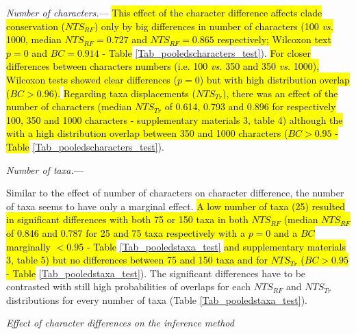 \documentclass[12pt,letterpaper]{article}
\renewcommand{\subsection}[1]{%
\bigskip
\begin{center}
\begin{large}
\normalfont\itshape #1
\end{large}
\end{center}}
\renewcommand{\subsubsection}[1]{%
\vspace{2ex}
\noindent
\textit{#1.}---}
\begin{document}


\subsubsection{Number of characters}
\hl{This effect of the character difference affects clade conservation ($NTS_{RF}$) only by big differences in number of characters (100 \textit{vs.} 1000, median $NTS_{RF} = 0.727$ and $NTS_{RF} = 0.865$ respectively; Wilcoxon text $p = 0$ and $BC = 0.914$ - Table}
\ref{Tab_pooledscharacters_test}).
\hl{For closer differences between characters numbers (i.e. 100 \textit{vs.} 350 and 350 \textit{vs.} 1000), Wilcoxon tests showed clear differences ($p = 0$) but with high distribution overlap ($BC > 0.96$).}
\hl{Regarding taxa displacements ($NTS_{Tr}$), there was an effect of the number of characters (median $NTS_{Tr}$ of 0.614, 0.793 and 0.896 for respectively 100, 350 and 1000 characters - supplementary materials 3, table 4) although the with a high distribution overlap between 350 and 1000 characters ($BC > 0.95$ - Table}
\ref{Tab_pooledscharacters_test}).




\subsubsection{Number of taxa}

Similar to the effect of number of characters on character difference, the number of taxa seems to have only a marginal effect.
\hl{A low number of taxa (25) resulted in significant differences with both 75 or 150 taxa in both $NTS_{RF}$ (median $NTS_{RF}$ of 0.846 and 0.787 for 25 and 75 taxa respectively with a $p = 0$ and a $BC$ marginally $< 0.95$ - Table}
\ref{Tab_pooledstaxa_test}
\hl{and supplementary materials 3, table 5) but no differences between 75 and 150 taxa and for $NTS_{Tr}$ ($BC > 0.95$ - Table}
\ref{Tab_pooledstaxa_test}).
The significant differences have to be contrasted with still high probabilities of overlaps for each $NTS_{RF}$ and $NTS_{Tr}$ distributions for every number of taxa (Table \ref{Tab_pooledstaxa_test}).



\subsection{Effect of character differences on the inference method}
\end{document}
